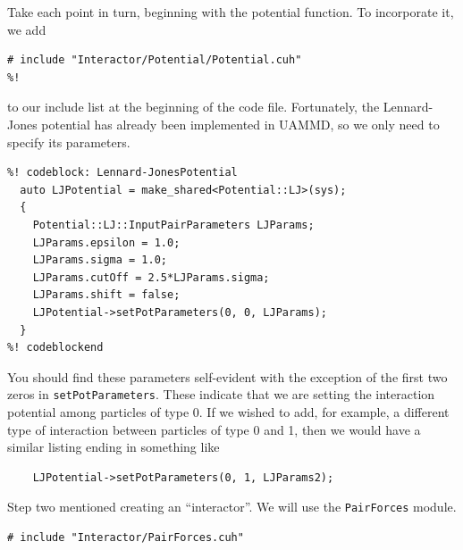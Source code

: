 Take each point in turn, beginning with the potential function. To incorporate
it, we add
\begin{lstlisting}
# include "Interactor/Potential/Potential.cuh"
%!
\end{lstlisting}
to our include list at the beginning of the code file. Fortunately, the
Lennard-Jones potential has already been implemented in UAMMD, so we
only need to specify its parameters.
\begin{lstlisting}
%! codeblock: Lennard-JonesPotential
  auto LJPotential = make_shared<Potential::LJ>(sys);
  {
    Potential::LJ::InputPairParameters LJParams;
    LJParams.epsilon = 1.0;
    LJParams.sigma = 1.0;
    LJParams.cutOff = 2.5*LJParams.sigma;
    LJParams.shift = false;
    LJPotential->setPotParameters(0, 0, LJParams);
  }
%! codeblockend
\end{lstlisting}
You should find these parameters self-evident with the exception of the first
two zeros in \texttt{setPotParameters}. These indicate that we are setting the
interaction potential among particles of type 0. If we wished to add, for
example, a different type of interaction between particles of type 0 and 1,
then we would have a similar listing ending in something like
\begin{lstlisting}
    LJPotential->setPotParameters(0, 1, LJParams2);
\end{lstlisting}

Step two mentioned creating an ``interactor''. We will use the
\texttt{PairForces} module.
\begin{lstlisting}
# include "Interactor/PairForces.cuh"
\end{lstlisting}

